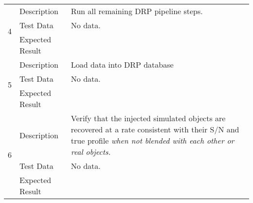 \begin{longtable}[]{p{1.3cm}p{2cm}p{13cm}}
            \multirow{3}{*}{ 4 } & Description &
            \begin{minipage}[t]{13cm}{\footnotesize
            Run all remaining DRP pipeline steps.

            \vspace{\dp0}
            } \end{minipage} \\ \cline{2-3}
            & Test Data &
            \begin{minipage}[t]{13cm}{\footnotesize
                No data.
                \vspace{\dp0}
            } \end{minipage} \\ \cline{2-3}
            & Expected Result &
        \\ \midrule

            \multirow{3}{*}{ 5 } & Description &
            \begin{minipage}[t]{13cm}{\footnotesize
            ​​​​Load data into DRP database

            \vspace{\dp0}
            } \end{minipage} \\ \cline{2-3}
            & Test Data &
            \begin{minipage}[t]{13cm}{\footnotesize
                No data.
                \vspace{\dp0}
            } \end{minipage} \\ \cline{2-3}
            & Expected Result &
        \\ \midrule

            \multirow{3}{*}{ 6 } & Description &
            \begin{minipage}[t]{13cm}{\footnotesize
            Verify that the injected simulated objects are recovered at a rate
consistent with their S/N and true profile \emph{when not blended with
each other or real objects.}

            \vspace{\dp0}
            } \end{minipage} \\ \cline{2-3}
            & Test Data &
            \begin{minipage}[t]{13cm}{\footnotesize
                No data.
                \vspace{\dp0}
            } \end{minipage} \\ \cline{2-3}
            & Expected Result &
        \\ \midrule
    \end{longtable}

